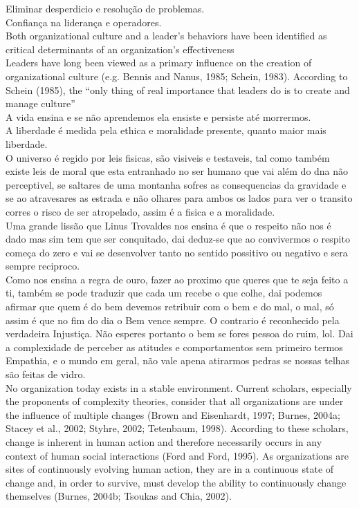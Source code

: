 Eliminar desperdicio e resolução de problemas.\\

Confiança na liderança e operadores.\\
Both organizational culture and a leader’s behaviors have been identified as critical determinants of an organization’s effectiveness\\
Leaders have long been viewed as a primary influence on the creation of organizational culture (e.g. Bennis and Nanus, 1985; Schein, 1983). According to Schein (1985), the “only thing of real importance that leaders do is to create and manage culture”\\


A vida ensina e se não aprendemos ela ensiste e persiste até morrermos.\\

A liberdade é medida pela ethica e moralidade presente, quanto maior mais liberdade.\\


O universo é regido por leis fisicas, são visiveis e testaveis, tal como também existe leis de moral que esta entranhado no ser humano que vai além do dna não perceptivel, se saltares de uma montanha sofres as consequencias da gravidade e se ao atravesares as estrada e não olhares para ambos os lados para ver o transito corres o risco de ser atropelado, assim é a fisica e a moralidade.\\

Uma grande lissão que Linus Trovaldes nos ensina é que o respeito não nos é dado mas sim tem que ser conquitado, dai deduz-se que ao convivermos o respito começa do zero e vai se desenvolver tanto no sentido possitivo ou negativo e sera sempre reciproco.\\

Como nos ensina a regra de ouro, fazer ao proximo que queres que te seja feito a ti, também se pode traduzir que cada um recebe o que colhe, dai podemos afirmar que quem é do bem devemos retribuir com o bem e do mal, o mal, só assim é que no fim do dia o Bem vence sempre. O contrario é reconhecido pela verdadeira Injustiça. Não esperes portanto o bem se fores pessoa do ruim, lol. Dai a complexidade de perceber as atitudes e comportamentos sem primeiro termos Empathia, e o mundo em geral, não vale apena atirarmos pedras se nossas telhas são feitas de vidro.\\
No organization today exists in a stable environment. Current scholars, especially the
proponents of complexity theories, consider that all organizations are under the influence
of multiple changes (Brown and Eisenhardt, 1997; Burnes, 2004a; Stacey et al., 2002;
Styhre, 2002; Tetenbaum, 1998). According to these scholars, change is inherent in
human action and therefore necessarily occurs in any context of human social interactions
(Ford and Ford, 1995). As organizations are sites of continuously evolving human action,
they are in a continuous state of change and, in order to survive, must develop the ability
to continuously change themselves (Burnes, 2004b; Tsoukas and Chia, 2002).\\

